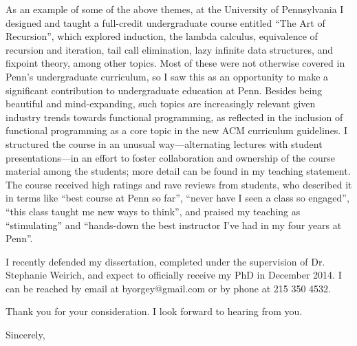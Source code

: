 \begin{letter}{\thereaddress}
{  As an example of some of the above themes, at the University of
  Pennsylvania I designed and taught a full-credit undergraduate
  course entitled ``The Art of Recursion'', which explored induction,
  the lambda calculus, equivalence of recursion and iteration, tail
  call elimination, lazy infinite data structures, and fixpoint
  theory, among other topics.  Most of these were not otherwise
  covered in Penn's undergraduate curriculum, so I saw this as an
  opportunity to make a significant contribution to undergraduate
  education at Penn.  Besides being beautiful and mind-expanding, such
  topics are increasingly relevant given industry trends towards
  functional programming, as reflected in the inclusion of functional
  programming as a core topic in the new ACM curriculum guidelines.  I
  structured the course in an unusual way---alternating lectures with
  student presentations---in an effort to foster collaboration and
  ownership of the course material among the students; more detail can
  be found in my teaching statement.  The course received high ratings
  and rave reviews from students, who described it in terms like
  ``best course at Penn so far'', ``never have I seen a class so
  engaged'', ``this class taught me new ways to think'', and praised
  my teaching as ``stimulating'' and ``hands-down the best instructor
  I've had in my four years at Penn''.

} %

\placespecific

I recently defended my dissertation, completed under the supervision
of Dr. Stephanie Weirich, and expect to officially receive my PhD in
December 2014.  I can be reached by email at
\textsf{byorgey@gmail.com} or by phone at \textsf{215 350 4532}.

Thank you for your consideration.  I look forward to hearing from you.

\closing{Sincerely,}

\end{letter}


